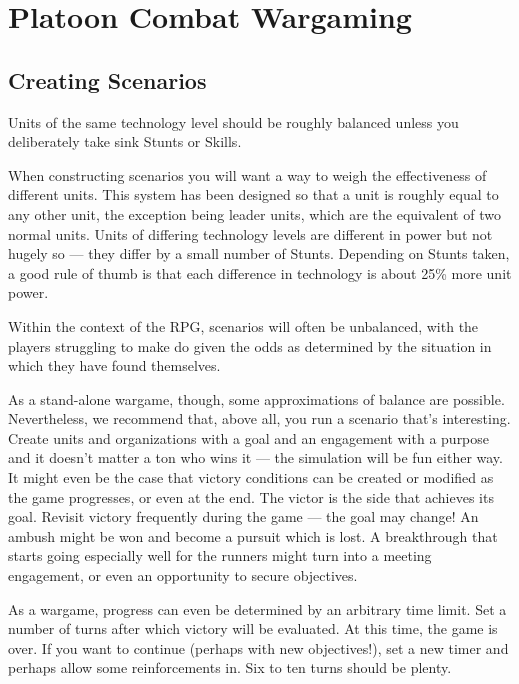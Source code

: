\section[Wargaming]{Platoon Combat Wargaming}
\label{sec:platoon-combat-wargaming}

\subsection{Creating Scenarios}
\label{sec:platoon-combat-creating-scenarios}

Units of the same technology level should be roughly balanced unless you deliberately take sink Stunts or Skills.

When constructing scenarios you will want a way to weigh the effectiveness of different units. This system has been designed so that a unit is roughly equal to any other unit, the exception being leader units, which are the equivalent of two normal units. Units of differing technology levels are different in power but not hugely so --- they differ by a small number of Stunts. Depending on Stunts taken, a good rule of thumb is that each difference in technology is about 25\% more unit power.

Within the context of the RPG, scenarios will often be unbalanced, with the players struggling to make do given the odds as determined by the situation in which they have found themselves.

As a stand-alone wargame, though, some approximations of balance are possible. Nevertheless, we recommend that, above all, you run a scenario that's interesting. Create units and organizations with a goal and an engagement with a purpose and it doesn't matter a ton who wins it --- the simulation will be fun either way. It might even be the case that victory conditions can be created or modified as the game progresses, or even at the end. The victor is the side that achieves its goal. Revisit victory frequently during the game --- the goal may change! An ambush might be won and become a pursuit which is lost. A breakthrough that starts going especially well for the runners might turn into a meeting engagement, or even an opportunity to secure objectives.

As a wargame, progress can even be determined by an arbitrary time limit. Set a number of turns after which victory will be evaluated. At this time, the game is over. If you want to continue (perhaps with new objectives!), set a new timer and perhaps allow some reinforcements in. Six to ten turns should be plenty.

